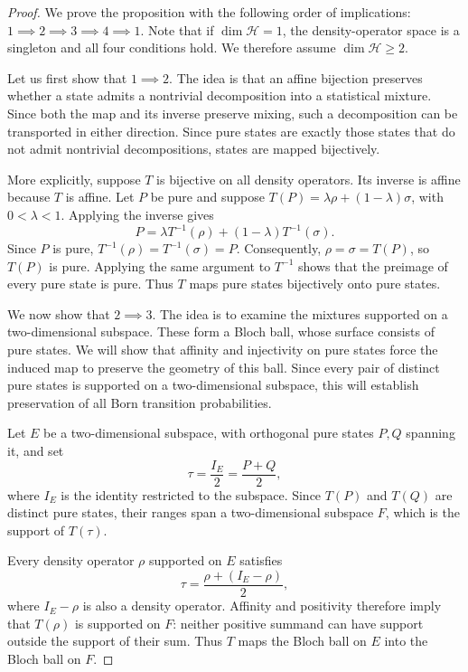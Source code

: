 \documentclass[entropy,article,submit,moreauthors]{Definitions/mdpi}
\begin{document}
\begin{proof}
	We prove the proposition with the following order of implications: $1\implies2\implies3\implies4\implies1$.
	Note that if $\dim\mathcal{H}=1$, the density-operator space is a singleton
	and all four conditions hold. We therefore assume
	$\dim\mathcal{H}\geq2$.
	
	Let us first show that $1\implies2$. The idea is that an affine
	bijection preserves whether a state admits a nontrivial
	decomposition into a statistical mixture. Since both the map
	and its inverse preserve mixing, such a decomposition can
	be transported in either direction. Since pure states are exactly those states that do not admit nontrivial decompositions, states are mapped bijectively.
	
	More explicitly, suppose $T$ is bijective on all density
	operators. Its inverse is affine because $T$ is affine.
	Let $P$ be pure and suppose
	$T(P)=\lambda\rho+(1-\lambda)\sigma$, with $0<\lambda<1$.
	Applying the inverse gives
	\begin{equation}
		P=\lambda T^{-1}(\rho)+(1-\lambda)T^{-1}(\sigma).
	\end{equation}
	Since $P$ is pure,
	$T^{-1}(\rho)=T^{-1}(\sigma)=P$.
	Consequently, $\rho=\sigma=T(P)$, so $T(P)$ is pure.
	Applying the same argument to $T^{-1}$ shows that the
	preimage of every pure state is pure. Thus $T$ maps pure
	states bijectively onto pure states.

	We now show that $2\implies3$. The idea is to examine the mixtures supported on a two-dimensional subspace. These form a Bloch ball, whose surface consists of pure states. We will show that affinity and injectivity on pure states force the induced map to preserve the geometry of this ball. Since every pair of distinct pure states is supported on a two-dimensional subspace, this will establish preservation of all Born transition probabilities.

	Let $E$ be a two-dimensional subspace, with orthogonal pure states $P,Q$ spanning it, and set
	\begin{equation}
	\tau=\frac{I_E}{2}=\frac{P+Q}{2},
	\end{equation}
	where $I_E$ is the identity restricted to the subspace. Since $T(P)$ and $T(Q)$ are distinct pure states, their ranges span a two-dimensional subspace $F$, which is the support of $T(\tau)$.

	Every density operator $\rho$ supported on $E$ satisfies
	\begin{equation}
	\tau=\frac{\rho+(I_E-\rho)}{2},
	\end{equation}
	where $I_E-\rho$ is also a density operator. Affinity and positivity therefore imply that $T(\rho)$ is supported on $F$: neither positive summand can have support outside the support of their sum. Thus $T$ maps the Bloch ball on $E$ into the Bloch ball on $F$.


\end{proof}
\end{document}
